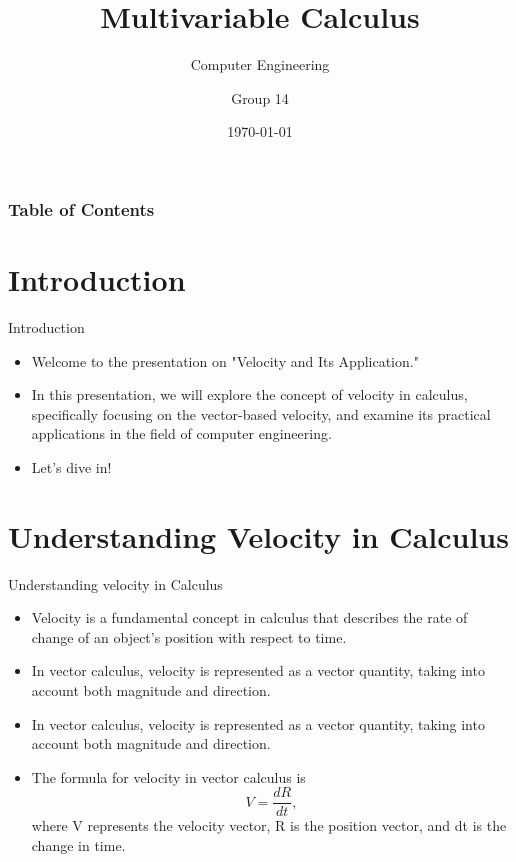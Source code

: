 \documentclass{beamer}
\title{Multivariable Calculus}
\subtitle{Computer Engineering}
\author{Group 14}
\institute{KNUST}
\date{\today}
\begin{document}
\begin{frame}[plain]
    \titlepage
\end{frame}


{
\begin{frame}
    \frametitle{Table of Contents}
    \tableofcontents
\end{frame}
}


\section{Introduction}

\begin{frame}{Introduction}
    \begin{itemize}
        \item Welcome to the presentation on "Velocity and Its Application."
        \item In this presentation, we will explore the concept of velocity in calculus, specifically focusing
on the vector-based velocity, and examine its practical applications in the field of computer
engineering.
        \item Let's dive in!
    \end{itemize}
\end{frame}




\section{Understanding Velocity in Calculus}


\begin{frame}[t]{Understanding velocity in Calculus}
    \vspace{20pt}
    \begin{itemize}
        \item Velocity is a fundamental concept in calculus that describes the rate of change of an
object's position with respect to time.  
        \item In vector calculus, velocity is represented as a vector quantity, taking into account both
magnitude and direction.
        \item In vector calculus, velocity is represented as a vector quantity, taking into account both
magnitude and direction.
        \item The formula for velocity in vector calculus is 
          \begin{equation*}
        V = \frac{dR}{dt},
        \end{equation*}
        where V represents the velocity
vector, R is the position vector, and dt is the change in time.
    \end{itemize}
\end{frame}
\end{document}
